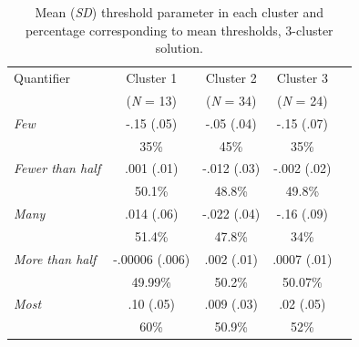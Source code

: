 \documentclass{article}
\begin{document}
\begin{table}[H]
    \centering
    \caption{Mean (\textit{SD}) threshold parameter in each cluster and percentage corresponding to mean thresholds, 3-cluster solution.}
    \label{tab:tab2.2}
    \begin{tabular}{lcccc}\hline
         Quantifier & Cluster 1  & Cluster 2  & Cluster 3 \\
          & (\textit{N} = 13) & (\textit{N} = 34) & (\textit{N} = 24) \\ \hline
         \textit{Few} & -.15 (.05) & -.05 (.04) & -.15 (.07)\\
          &  35\% &  45\% &  35\%\\
         \textit{Fewer than half} & .001 (.01) & -.012 (.03) & -.002 (.02)\\
         & 50.1\% & 48.8\% & 49.8\%\\
         \textit{Many} & .014 (.06) & -.022 (.04) & -.16 (.09)\\
         & 51.4\% & 47.8\% & 34\%\\
         \textit{More than half} & -.00006 (.006) & .002 (.01) & .0007 (.01) \\
         & 49.99\% & 50.2\% & 50.07\% \\
         \textit{Most} & .10 (.05) & .009 (.03) & .02 (.05)\\ 
         & 60\% & 50.9\% & 52\%\\\hline
    \end{tabular}
\end{table}
\end{document}
